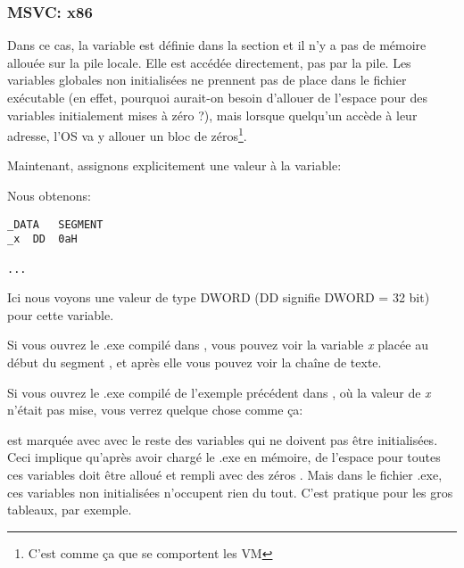 \subsubsection{MSVC: x86}



Dans ce cas, la variable  est définie dans la section  et il n'y
a pas de mémoire allouée sur la pile locale. Elle est accédée directement, pas par
la pile.
Les variables globales non initialisées ne prennent pas de place dans le fichier
exécutable (en effet, pourquoi aurait-on besoin d'allouer de l'espace pour des variables
initialement mises à zéro ?), mais lorsque quelqu'un accède à leur adresse, l'\ac{OS}
va y allouer un bloc de zéros\footnote{C'est comme ça que se comportent les \ac{VM}}.

Maintenant, assignons explicitement une valeur à la variable:



Nous obtenons:

\begin{lstlisting}[style=customasmx86]
_DATA	SEGMENT
_x	DD	0aH

...
\end{lstlisting}

Ici nous voyons une valeur  de type DWORD (DD signifie DWORD = 32 bit) pour
cette variable.

Si vous ouvrez le .exe compilé dans \IDA, vous pouvez voir la variable \emph{x} placée
au début du segment , et après elle vous pouvez voir la chaîne de texte.

Si vous ouvrez le .exe compilé de l'exemple précédent dans \IDA, où la valeur de
\emph{x} n'était pas mise, vous verrez quelque chose comme ça:



 est marquée avec  avec le reste des variables qui ne doivent pas être
initialisées.
Ceci implique qu'après avoir chargé le .exe en mémoire, de l'espace pour toutes ces
variables doit être alloué et rempli avec des zéros .
Mais dans le fichier .exe, ces variables non initialisées n'occupent rien du tout.
C'est pratique pour les gros tableaux, par exemple.



